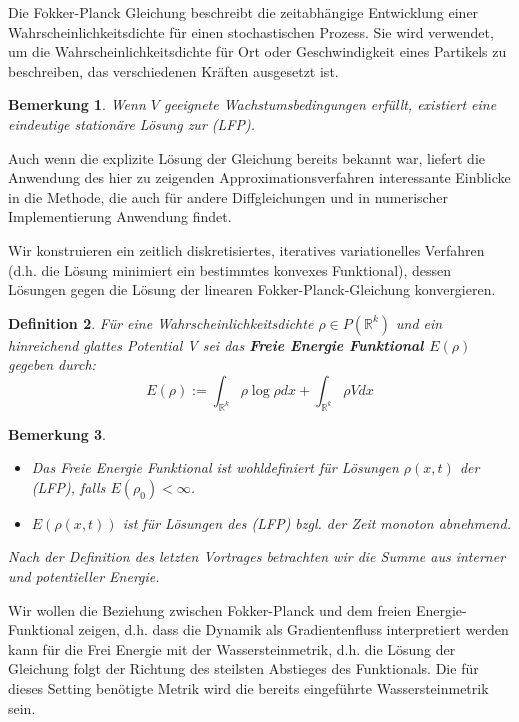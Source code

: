 \documentclass[11pt,a4paper,notitlepage]{scrreprt}
\newcommand{\RR}{\mathbb{R}}
\newtheorem{defi}{Definition}[section]
\newtheorem{bem}[defi]{Bemerkung}
\begin{document}
Die Fokker-Planck Gleichung beschreibt die zeitabhängige Entwicklung einer Wahrscheinlichkeitsdichte für einen stochastischen Prozess. Sie wird verwendet, um die Wahrscheinlichkeitsdichte für Ort oder Geschwindigkeit eines Partikels zu beschreiben, das verschiedenen Kräften ausgesetzt ist.

\begin{bem}
Wenn $V$ geeignete Wachstumsbedingungen erfüllt, existiert eine eindeutige stationäre Lösung zur (LFP).
\end{bem}
Auch wenn die explizite Lösung der Gleichung bereits bekannt war, liefert die Anwendung des hier zu zeigenden Approximationsverfahren interessante Einblicke in die Methode, die auch für andere Diffgleichungen und in numerischer Implementierung Anwendung findet. 


Wir konstruieren ein zeitlich diskretisiertes, iteratives variationelles Verfahren (d.h. die Lösung minimiert ein bestimmtes konvexes Funktional), dessen Lösungen gegen die Lösung der linearen Fokker-Planck-Gleichung konvergieren.

\begin{defi}
Für eine Wahrscheinlichkeitsdichte $\rho\in P(\RR^k)$ und ein hinreichend glattes Potential V sei das \textbf{Freie Energie Funktional $E(\rho)$} gegeben durch:
\begin{equation}
E(\rho):=\int_{\RR^k} \rho\log\rho dx + \int_{\RR^k}\rho V dx \label{FEFktn}
\end{equation}
\end{defi}

\begin{bem}
\begin{itemize}
\item Das Freie Energie Funktional ist wohldefiniert für Lösungen $\rho(x,t)$ der (LFP), falls $E(\rho_0)<\infty$.
\item $E(\rho(x,t))$ ist für Lösungen des (LFP) bzgl. der Zeit monoton abnehmend.\end{itemize}
\item Nach der Definition des letzten Vortrages betrachten wir die Summe aus interner und potentieller Energie.
\end{bem}

Wir wollen die Beziehung zwischen Fokker-Planck und dem freien Energie-Funktional zeigen, d.h. dass die Dynamik als Gradientenfluss interpretiert werden kann für die Frei Energie mit der Wassersteinmetrik, d.h. die Lösung der Gleichung folgt der Richtung des steilsten Abstieges des Funktionals. Die für dieses Setting benötigte Metrik wird die bereits eingeführte Wassersteinmetrik sein. \\
\end{document}
